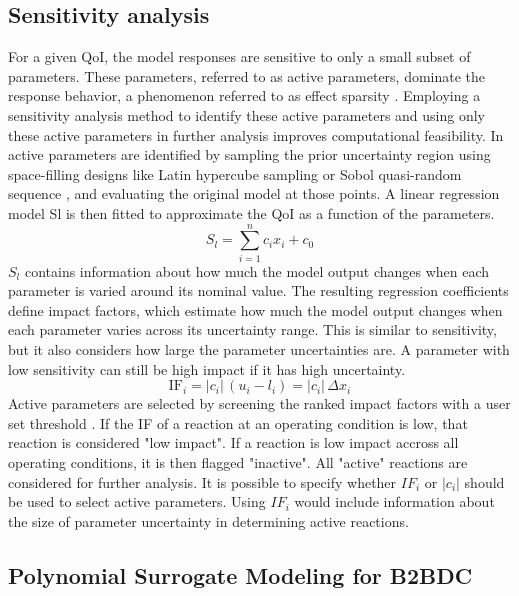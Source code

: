\subsection{Sensitivity analysis}
For a given QoI, the model responses are sensitive to only a small subset of parameters. These parameters, referred to as active parameters, dominate the response behavior, a phenomenon referred to as effect sparsity \cite{frenklach_optimization_1992}. Employing a sensitivity analysis method to identify these active parameters and using only these active parameters in further analysis improves computational feasibility. 
In \cite{li_development_nodate} active parameters are identified by sampling the prior uncertainty region using space-filling designs like Latin hypercube sampling \cite{mckay_comparison_1979} or Sobol quasi-random sequence \cite{sobol_distribution_1967}, and evaluating the original model at those points. A linear regression model Sl is then fitted to approximate the QoI as a function of the parameters.
\begin{equation}
	S_l = \sum_{i=1}^{n} c_i x_i + c_0
\end{equation}
$S_l$ contains information about how much the model output changes when each parameter is varied around its nominal value. 
The resulting regression coefficients define impact factors, which estimate how much the model output changes when each parameter varies across its uncertainty range. This is similar to sensitivity, but it also considers how large the parameter uncertainties are. A parameter with low sensitivity can still be high impact if it has high uncertainty. 
\begin{equation}
	\mathrm{IF}_i = \left|c_i\right| \,\left(u_i - l_i\right)
	= \left|c_i\right| \,\Delta x_i
\end{equation}
Active parameters are selected by screening the ranked impact factors with a user set threshold \cite{li_development_nodate}. If the IF of a reaction at an operating condition is low, that reaction is considered "low impact". If a reaction is low impact accross all operating conditions, it is then flagged "inactive". All "active" reactions are considered for further analysis. It is possible to specify whether ${IF}_i$ or $|c_i|$ should be used to select active parameters. Using ${IF}_i$ would include information about the size of parameter uncertainty in determining active reactions. 

\subsection{Polynomial Surrogate Modeling for B2BDC}


